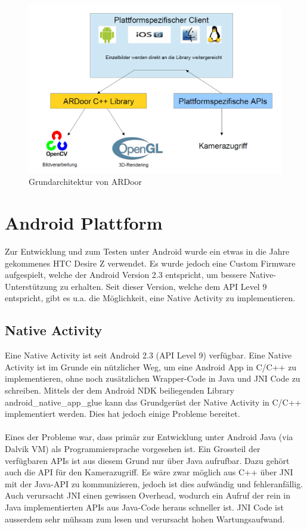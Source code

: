 \begin{figure}[!ht]
\centering
\includegraphics[scale=0.4]{images/architecture.png} 
\caption{Grundarchitektur von ARDoor}
\label{fig:android-architecture}
\end{figure}

\section{Android Plattform}
Zur Entwicklung und zum Testen unter Android wurde ein etwas in die Jahre gekommenes HTC Desire Z verwendet. Es wurde jedoch eine Custom Firmware aufgespielt, welche der Android Version 2.3 entspricht, um bessere Native-Unterstützung zu erhalten. Seit dieser Version, welche dem API Level 9 entspricht, gibt es u.a. die Möglichkeit, eine Native Activity zu implementieren.


\subsection{Native Activity}
Eine Native Activity ist seit Android 2.3 (API Level 9) verfügbar. Eine Native Activity ist im Grunde ein nützlicher Weg, um eine Android App in C/C++ zu implementieren, ohne noch zusätzlichen Wrapper-Code in Java und JNI Code zu schreiben. Mittels der dem Android NDK beiliegenden Library android\_native\_app\_glue kann das Grundgerüst der Native Activity in C/C++ implementiert werden. Dies hat jedoch einige Probleme bereitet.

\paragraph{}
Eines der Probleme war, dass primär zur Entwicklung unter Android Java (via Dalvik VM) als Programmiersprache vorgesehen ist. Ein Grossteil der verfügbaren APIs ist aus diesem Grund nur über Java aufrufbar. Dazu gehört auch die API für den Kamerazugriff. Es wäre zwar möglich aus C++ über JNI mit der Java-API zu kommunizieren, jedoch ist dies aufwändig und fehleranfällig. Auch verursacht JNI einen gewissen Overhead, wodurch ein Aufruf der rein in Java implementierten APIs aus Java-Code heraus schneller ist. JNI Code ist ausserdem sehr mühsam zum lesen und verursacht hohen Wartungsaufwand.

